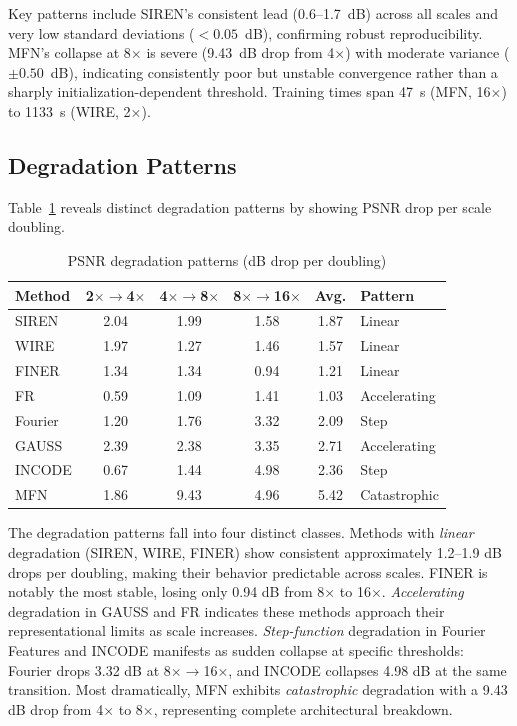 \documentclass[a4paper,oneside,10pt,ngerman,english]{scrartcl}
\begin{document}
Key patterns include SIREN's consistent lead (0.6--1.7~dB) across all scales and very low standard deviations ($<0.05$~dB), confirming robust reproducibility. MFN's collapse at 8$\times$ is severe (9.43~dB drop from 4$\times$) with moderate variance ($\pm 0.50$~dB), indicating consistently poor but unstable convergence rather than a sharply initialization-dependent threshold. Training times span 47~s (MFN, 16$\times$) to 1133~s (WIRE, 2$\times$).

\subsection{Degradation Patterns}

Table~\ref{tab:degradation} reveals distinct degradation patterns by showing PSNR drop per scale doubling.

\begin{table}[htbp]
\centering
\caption{PSNR degradation patterns (dB drop per doubling)}
\label{tab:degradation}
\begin{tabular}{lccccl}
\toprule
\textbf{Method} & \textbf{2$\times$$\to$4$\times$} & \textbf{4$\times$$\to$8$\times$} & \textbf{8$\times$$\to$16$\times$} & \textbf{Avg.} & \textbf{Pattern} \\
\midrule
SIREN & 2.04 & 1.99 & 1.58 & 1.87 & Linear \\
WIRE & 1.97 & 1.27 & 1.46 & 1.57 & Linear \\
FINER & 1.34 & 1.34 & 0.94 & 1.21 & Linear \\
FR & 0.59 & 1.09 & 1.41 & 1.03 & Accelerating \\
Fourier & 1.20 & 1.76 & 3.32 & 2.09 & Step \\
GAUSS & 2.39 & 2.38 & 3.35 & 2.71 & Accelerating \\
INCODE & 0.67 & 1.44 & 4.98 & 2.36 & Step \\
MFN & 1.86 & 9.43 & 4.96 & 5.42 & Catastrophic \\
\bottomrule
\end{tabular}
\end{table}

The degradation patterns fall into four distinct classes. Methods with \textit{linear} degradation (SIREN, WIRE, FINER) show consistent approximately 1.2--1.9 dB drops per doubling, making their behavior predictable across scales. FINER is notably the most stable, losing only 0.94 dB from 8$\times$ to 16$\times$. \textit{Accelerating} degradation in GAUSS and FR indicates these methods approach their representational limits as scale increases. \textit{Step-function} degradation in Fourier Features and INCODE manifests as sudden collapse at specific thresholds: Fourier drops 3.32 dB at 8$\times$$\to$16$\times$, and INCODE collapses 4.98 dB at the same transition. Most dramatically, MFN exhibits \textit{catastrophic} degradation with a 9.43 dB drop from 4$\times$ to 8$\times$, representing complete architectural breakdown.
\end{document}
